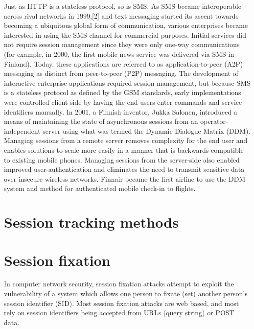 Just as HTTP is a stateless protocol, so is SMS. As SMS became interoperable across rival networks in 1999,[2] and text messaging started its ascent towards becoming a ubiquitous global form of communication, various enterprises became interested in using the SMS channel for commercial purposes. Initial services did not require session management since they were only one-way communications (for example, in 2000, the first mobile news service was delivered via SMS in Finland). Today, these applications are referred to as application-to-peer (A2P) messaging as distinct from peer-to-peer (P2P) messaging. The development of interactive enterprise applications required session management, but because SMS is a stateless protocol as defined by the GSM standards, early implementations were controlled client-side by having the end-users enter commands and service identifiers manually. In 2001, a Finnish inventor, Jukka Salonen, introduced a means of maintaining the state of asynchronous sessions from an operator-independent server using what was termed the Dynamic Dialogue Matrix (DDM). Managing sessions from a remote server removes complexity for the end user and enables solutions to scale more easily in a manner that is backwards compatible to existing mobile phones. Managing sessions from the server-side also enabled improved user-authentication and eliminates the need to transmit sensitive data over insecure wireless networks. Finnair became the first airline to use the DDM system and method for authenticated mobile check-in to flights.












\chapter{Session tracking methods}



\chapter{Session fixation}

In computer network security, session fixation\cite{session_fixation} attacks attempt to exploit the vulnerability of a system which allows one person to fixate (set) another person's session identifier (SID). Most session fixation attacks are web based, and most rely on session identifiers being accepted from URLs (query string) or POST data.




